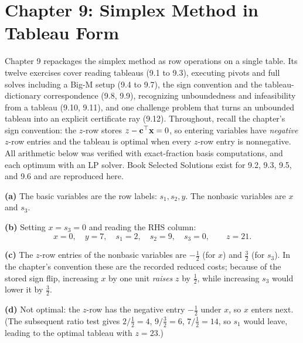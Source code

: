 \section{Chapter 9: Simplex Method in Tableau Form}

Chapter 9 repackages the simplex method as row operations on a single
table. Its twelve exercises cover reading tableaus (9.1 to 9.3), executing
pivots and full solves including a Big-M setup (9.4 to 9.7), the sign
convention and the tableau-dictionary correspondence (9.8, 9.9),
recognizing unboundedness and infeasibility from a tableau (9.10, 9.11),
and one challenge problem that turns an unbounded tableau into an explicit
certificate ray (9.12). Throughout, recall the chapter's sign convention:
the $z$-row stores $z - \mathbf{c}^\top\mathbf{x} = 0$, so entering variables have
\emph{negative} $z$-row entries and the tableau is optimal when every
$z$-row entry is nonnegative. All arithmetic below was verified with
exact-fraction basis computations, and each optimum with an LP solver.
Book Selected Solutions exist for 9.2, 9.3, 9.5, and 9.6 and are
reproduced here.


\textbf{(a)} The basic variables are the row labels: $s_1, s_2, y$. The
nonbasic variables are $x$ and $s_3$.

\textbf{(b)} Setting $x = s_3 = 0$ and reading the RHS column:
\[
x = 0,\quad y = 7,\quad s_1 = 2,\quad s_2 = 9,\quad s_3 = 0,
\qquad z = 21.
\]

\textbf{(c)} The $z$-row entries of the nonbasic variables are
$-\tfrac12$ (for $x$) and $\tfrac32$ (for $s_3$). In the chapter's
convention these are the recorded reduced costs; because of the stored
sign flip, increasing $x$ by one unit \emph{raises} $z$ by $\tfrac12$,
while increasing $s_3$ would lower it by $\tfrac32$.

\textbf{(d)} Not optimal: the $z$-row has the negative entry $-\tfrac12$
under $x$, so $x$ enters next. (The subsequent ratio test gives
$2/\tfrac12 = 4$, $9/\tfrac32 = 6$, $7/\tfrac12 = 14$, so $s_1$ would
leave, leading to the optimal tableau with $z = 23$.)

